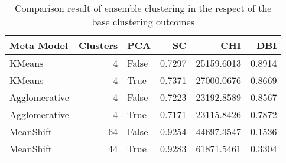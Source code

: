 \begin{table}[t]
\centering
\caption{Comparison result of ensemble clustering in the respect of the base clustering outcomes}
\label{tbl:meta_clustering_score_results}
\begin{tabular}{lrlrrr}
\toprule
   Meta Model &  Clusters &   PCA &     SC &        CHI &    DBI \\
\midrule
       KMeans &         4 & False & 0.7297 & 25159.6013 & 0.8914 \\
       KMeans &         4 &  True & 0.7371 & 27000.0676 & 0.8669 \\
Agglomerative &         4 & False & 0.7223 & 23192.8589 & 0.8567 \\
Agglomerative &         4 &  True & 0.7171 & 23115.8426 & 0.7872 \\
    MeanShift &        64 & False & 0.9254 & 44697.3547 & 0.1536 \\
    MeanShift &        44 &  True & 0.9283 & 61871.5461 & 0.3304 \\
\bottomrule
\end{tabular}
\end{table}
